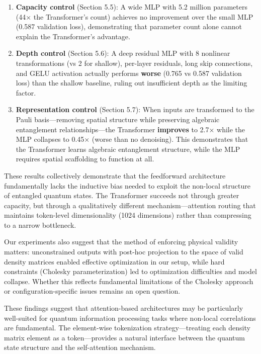 \documentclass[11pt]{article}
\begin{document}
\begin{enumerate}
\item \textbf{Capacity control} (Section 5.5): A wide MLP with 5.2 million parameters (44× the Transformer's count) achieves no improvement over the small MLP (0.587 validation loss), demonstrating that parameter count alone cannot explain the Transformer's advantage.

\item \textbf{Depth control} (Section 5.6): A deep residual MLP with 8 nonlinear transformations (vs 2 for shallow), per-layer residuals, long skip connections, and GELU activation actually performs \textbf{worse} (0.765 vs 0.587 validation loss) than the shallow baseline, ruling out insufficient depth as the limiting factor.

\item \textbf{Representation control} (Section 5.7): When inputs are transformed to the Pauli basis—removing spatial structure while preserving algebraic entanglement relationships—the Transformer \textbf{improves} to 2.7× while the MLP collapses to 0.45× (worse than no denoising). This demonstrates that the Transformer learns algebraic entanglement structure, while the MLP requires spatial scaffolding to function at all.
\end{enumerate}

These results collectively demonstrate that the feedforward architecture fundamentally lacks the inductive bias needed to exploit the non-local structure of entangled quantum states. The Transformer succeeds not through greater capacity, but through a qualitatively different mechanism—attention routing that maintains token-level dimensionality (1024 dimensions) rather than compressing to a narrow bottleneck.

Our experiments also suggest that the method of enforcing physical validity matters: unconstrained outputs with post-hoc projection to the space of valid density matrices enabled effective optimization in our setup, while hard constraints (Cholesky parameterization) led to optimization difficulties and model collapse. Whether this reflects fundamental limitations of the Cholesky approach or configuration-specific issues remains an open question.

These findings suggest that attention-based architectures may be particularly well-suited for quantum information processing tasks where non-local correlations are fundamental. The element-wise tokenization strategy—treating each density matrix element as a token—provides a natural interface between the quantum state structure and the self-attention mechanism.
\end{document}
